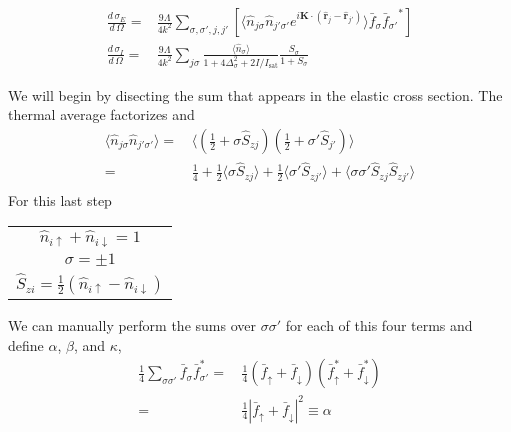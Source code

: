 \documentclass[11pt,letter]{article}
\newcommand{\bv}[1]{\ensuremath{\bm{#1}}}
\newcommand{\dsig}[1]{\ensuremath{ \frac{ d\,\sigma_{#1} }{d\,\Omega} }}
\begin{document}
\begin{equation}
\begin{split}
\dsig{E} =&   \frac{9\Lambda}{4k^{2}} 
               \sum_{ \sigma,\sigma', j, j' } [ \langle \hat{n}_{j\sigma}\hat{n}_{j'\sigma'}
              e^{ i \bv{K} \cdot ( \hat{\bv{r}}_{j} - \hat{\bv{r}}_{j'} )  } \rangle 
              \bar{f}_{\sigma} {\bar{f}_{\sigma'}}^{*} ] \\  
\dsig{I} =&  \frac{9\Lambda}{4k^{2}} 
              \sum_{j\sigma}
                     \frac{\langle \hat{n}_{\sigma} \rangle}{1+ 4\Delta_{\sigma}^{2} + 2 I / I_{\mathrm{sat}} }
             \frac{S_{\sigma}}{  1+S_{\sigma} } 
\end{split}
\end{equation}


We will begin by disecting the sum that appears in the elastic cross section.   The thermal average factorizes and 
\begin{equation}
\begin{split}
\langle  \hat{n}_{j\sigma}\hat{n}_{j'\sigma'} \rangle = &\, \langle (\frac{1}{2}  + \sigma\hat{S}_{zj} )( \frac{1}{2} + \sigma'\hat{S}_{j'} ) \rangle \\
       = &\,  \frac{1}{4} + \frac{1}{2} \langle \sigma \hat{S}_{zj} \rangle +
\frac{1}{2} \langle \sigma'\hat{S}_{zj'} \rangle + \langle \sigma\sigma'\hat{S}_{zj}\hat{S}_{zj'}
\rangle \\
\end{split} 
\end{equation}
For this last step
\begin{center}
  \begin{tabular}{ c  }
    $\hat{n}_{i\uparrow} + \hat{n}_{i\downarrow} = 1$   \\ 
    $\sigma = \pm 1$ \\
    $\hat{S}_{zi} = \frac{1}{2}( \hat{n}_{i\uparrow} - \hat{n}_{i\downarrow} )$ 
  \end{tabular}
\end{center}
We can manually perform the sums over $\sigma\sigma'$ for each of this four terms and define $\alpha$, $\beta$, and $\kappa$,
\begin{equation}
\begin{split}
\frac{1}{4} \sum_{\sigma\sigma'} \bar{f}_{\sigma} \bar{f}_{\sigma'}^{*} = &\, 
            \frac{1}{4}(\bar{f}_{\uparrow} + \bar{f}_{\downarrow})( \bar{f}_{\uparrow}^{*} + \bar{f}_{\downarrow}^{*} ) \\
       =&\, \frac{1}{4} | \bar{f}_{\uparrow} + \bar{f}_{\downarrow} | ^{2} \equiv \alpha
\end{split} 
\end{equation} 
\end{document}
